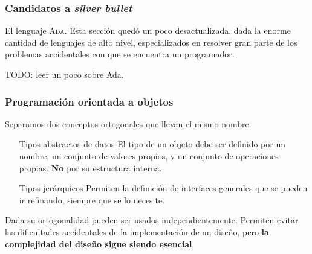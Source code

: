 \documentclass{beamer}
\begin{document}
\begin{frame}[fragile]
  \frametitle{Candidatos a \textit{silver bullet}}

  El lenguaje \textsc{Ada}.
  Esta secci\'on qued\'o un poco desactualizada, dada la enorme cantidad de
  lenguajes de alto nivel, especializados en resolver gran parte de los
  problemas accidentales con que se encuentra un programador.

  TODO: leer un poco sobre Ada.
\end{frame}


\begin{frame}[fragile]
  \frametitle{Programaci\'on orientada a objetos}
  Separamos dos conceptos ortogonales que llevan el mismo nombre.
  \begin{itemize}
    \item[Tipos abstractos de datos] El tipo de un objeto debe ser
      definido por un nombre, un conjunto de valores propios, y un conjunto
      de operaciones propias. \textbf{No} por su estructura interna.
    \item[Tipos jer\'arquicos] Permiten la definici\'on de interfaces generales
      que se pueden ir refinando, siempre que se lo necesite.
  \end{itemize}

  Dada su ortogonalidad pueden ser usados independientemente.
  Permiten evitar las dificultades accidentales de la implementaci\'on de un
  dise\~no, pero \textbf{la complejidad del dise\~no sigue siendo esencial}.
\end{frame}
\end{document}
